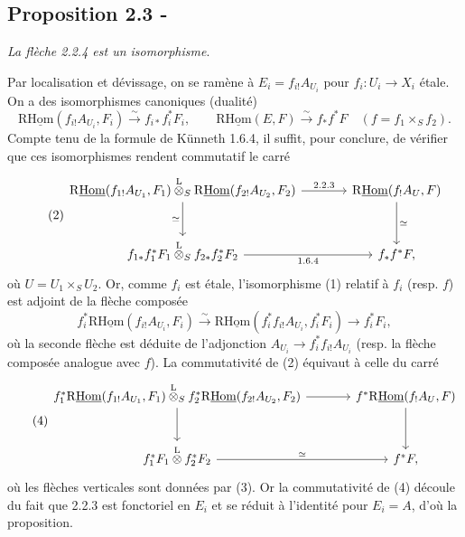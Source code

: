 \subsection*{Proposition 2.3 -}
\emph{La flèche 2.2.4 est un isomorphisme}.

Par localisation et dévissage, on se ramène à $E_i=f_{i!}A_{U_i}$ pour $f_i:U_i\to X_i$ étale. On a des isomorphismes canoniques (dualité)
\begin{equation}\tag{1}
\mathrm{R}\underline{\mathrm{Hom}}(f_{i!}A_{U_i},F_i)\xrightarrow{\sim}f_{i*}f_i^{*}F_i,
\qquad
\mathrm{R}\underline{\mathrm{Hom}}(E,F)\xrightarrow{\sim}f_{*}f^{*}F\quad(f=f_1\times_S f_2).
\end{equation}
Compte tenu de la formule de Künneth 1.6.4, il suffit, pour conclure, de vérifier que ces isomorphismes rendent commutatif le carré
\begin{equation}\tag{2}
\begin{tikzcd}[column sep=large,row sep=large]
\mathrm{R}\underline{\mathrm{Hom}}(f_{1!}A_{U_1},F_1)\overset{\mathrm{L}}{\otimes}_{S}\mathrm{R}\underline{\mathrm{Hom}}(f_{2!}A_{U_2},F_2) \arrow[r,"2.2.3"] \arrow[d,"\simeq"'] & \mathrm{R}\underline{\mathrm{Hom}}(f_{!}A_U,F) \arrow[d,"\simeq"]\\
f_{1*}f_1^{*}F_1\overset{\mathrm{L}}{\otimes}_{S}f_{2*}f_2^{*}F_2 \arrow[r,"1.6.4"'] & f_{*}f^{*}F,
\end{tikzcd}
\end{equation}
où $U=U_1\times_S U_2$. Or, comme $f_i$ est étale, l'isomorphisme (1) relatif à $f_i$ (resp. $f$) est adjoint de la flèche composée
\begin{equation}\tag{3}
f_i^{*}\mathrm{R}\underline{\mathrm{Hom}}(f_{i!}A_{U_i},F_i)\xrightarrow{\sim}\mathrm{R}\underline{\mathrm{Hom}}(f_i^{*}f_{i!}A_{U_i},f_i^{*}F_i)\longrightarrow f_i^{*}F_i,
\end{equation}
où la seconde flèche est déduite de l'adjonction $A_{U_i}\to f_i^{*}f_{i!}A_{U_i}$ (resp. la flèche composée analogue avec $f$). La commutativité de (2) équivaut à celle du carré
\begin{equation}\tag{4}
\begin{tikzcd}[column sep=large,row sep=large]
f_1^{*}\mathrm{R}\underline{\mathrm{Hom}}(f_{1!}A_{U_1},F_1)\overset{\mathrm{L}}{\otimes}_{S}f_2^{*}\mathrm{R}\underline{\mathrm{Hom}}(f_{2!}A_{U_2},F_2) \arrow[r] \arrow[d] & f^{*}\mathrm{R}\underline{\mathrm{Hom}}(f_{!}A_U,F) \arrow[d]\\
f_1^{*}F_1\overset{\mathrm{L}}{\otimes}f_2^{*}F_2 \arrow[r,"\simeq"] & f^{*}F,
\end{tikzcd}
\end{equation}
où les flèches verticales sont données par (3). Or la commutativité de (4) découle du fait que 2.2.3 est fonctoriel en $E_i$ et se réduit à l'identité pour $E_i=A$, d'où la proposition.

